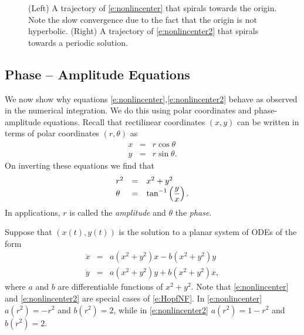 \documentclass{ximera}
\begin{document}
\begin{figure}[htb]
           \centerline{%
	   }
           \caption{(Left) A trajectory of \protect\eqref{e:nonlincenter}
that spirals towards the origin. Note the slow convergence due to the fact 
that the origin is not hyperbolic.  (Right) A trajectory of 
\protect\eqref{e:nonlincenter2} that spirals towards a periodic solution.}
           \label{F:nonlincenter}
\end{figure}

\subsection*{Phase -- Amplitude Equations}

We now show why equations \eqref{e:nonlincenter},\eqref{e:nonlincenter2} 
behave as observed in the numerical integration.  We do this using 
polar coordinates and phase-amplitude equations.  
Recall that rectilinear coordinates $(x,y)$ can be written in terms 
of polar coordinates $(r,\theta)$ as
\begin{eqnarray*}
x & = & r\cos\theta\\
y & = & r\sin\theta.
\end{eqnarray*}
On inverting these equations we find that
\arraystart
\begin{equation} \label{e:polarccord}
\begin{array}{lcl}
r^2 & = & x^2+y^2  \\
\theta & = & \displaystyle\tan^{-1}\left(\frac{y}{x}\right). 
\end{array}
\end{equation}
\arrayfinish
In applications, $r$ is called the {\em amplitude\/} and 
$\theta$ the {\em phase\/}.

Suppose that $(x(t),y(t))$ is the solution to a planar system of
ODEs of the form 
\begin{equation} \label{e:HopfNF}
\begin{array}{rcl}
\dot{x} & = & a(x^2+y^2)x - b(x^2+y^2)y\\
\dot{y} & = & a(x^2+y^2)y + b(x^2+y^2)x,
\end{array}
\end{equation}
where $a$ and $b$ are differentiable functions of $x^2+y^2$.
Note that \eqref{e:nonlincenter} and \eqref{e:nonlincenter2} are special cases 
of \eqref{e:HopfNF}.  In \eqref{e:nonlincenter} $a(r^2)=-r^2$ and $b(r^2)=2$, 
while in \eqref{e:nonlincenter2} $a(r^2)=1-r^2$ and $b(r^2)=2$.
\end{document}
